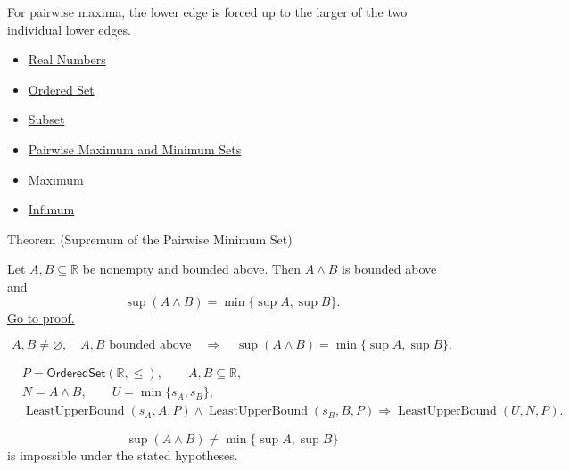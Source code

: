\begin{remark*}[Interpretation]
For pairwise maxima, the lower edge is forced up to the larger of the two
individual lower edges.
\end{remark*}

\begin{dependencies}
\begin{itemize}
  \item \hyperref[def:reals]{Real Numbers}
  \item \hyperref[def:ordered-set]{Ordered Set}
  \item \hyperref[def:subset]{Subset}
  \item \hyperref[def:pairwise-maximum-minimum-sets]{Pairwise Maximum and Minimum Sets}
  \item \hyperref[def:maximum]{Maximum}
  \item \hyperref[def:infimum]{Infimum}
\end{itemize}
\end{dependencies}

\begin{theorembox}{Theorem (Supremum of the Pairwise Minimum Set)}
\begin{theorem}
\label{thm:supremum-pairwise-minimum-set}
Let $A,B\subseteq\mathbb{R}$ be nonempty and bounded above. Then $A\wedge B$
is bounded above and
\[
\sup(A\wedge B)=\min\{\sup A,\sup B\}.
\]
\hyperref[prf:supremum-pairwise-minimum-set]{Go to proof.}
\end{theorem}
\end{theorembox}

\begin{remark*}
\[
A,B\neq\varnothing,\quad A,B\text{ bounded above}
\quad\Longrightarrow\quad
\sup(A\wedge B)=\min\{\sup A,\sup B\}.
\]
\end{remark*}

\begin{remark*}
\[
\begin{aligned}
&P=\mathsf{OrderedSet}(\mathbb{R},\leq),\qquad A,B\subseteq\mathbb{R},\\
&N=A\wedge B,\qquad U=\min\{s_A,s_B\},\\
&\operatorname{LeastUpperBound}(s_A,A,P)\land\operatorname{LeastUpperBound}(s_B,B,P)
\Longrightarrow
\operatorname{LeastUpperBound}(U,N,P).
\end{aligned}
\]
\end{remark*}

\begin{remark*}
\[
\sup(A\wedge B)\neq\min\{\sup A,\sup B\}
\]
is impossible under the stated hypotheses.
\end{remark*}

